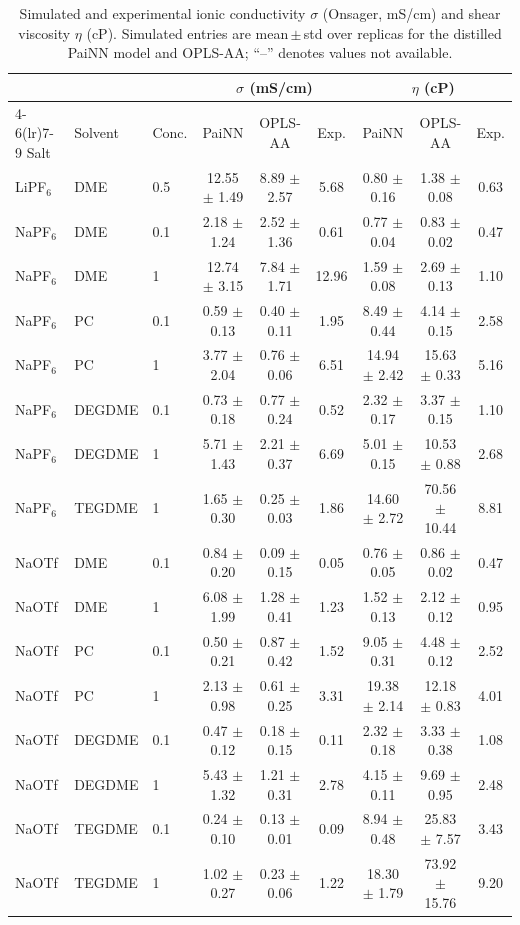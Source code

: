 \begin{table}[h]
\centering
\caption{Simulated and experimental ionic conductivity $\sigma$ (Onsager, mS/cm) and shear viscosity $\eta$ (cP). Simulated entries are mean\,$\pm$\,std over replicas for the distilled PaiNN model and OPLS-AA; ``--'' denotes values not available.}
\label{tab:transport-cond-visc}
\small
\setlength{\tabcolsep}{5pt}
\begin{tabular}{lll ccc ccc}
\toprule
 & & & \multicolumn{3}{c}{$\sigma$ (mS/cm)}
     & \multicolumn{3}{c}{$\eta$ (cP)} \\
\cmidrule(lr){4-6}\cmidrule(lr){7-9}
Salt & Solvent & Conc. & PaiNN & OPLS-AA & Exp. & PaiNN & OPLS-AA & Exp. \\
\midrule
LiPF$_6$ & DME & 0.5 & 12.55 $\pm$ 1.49 & 8.89 $\pm$ 2.57 & 5.68 & 0.80 $\pm$ 0.16 & 1.38 $\pm$ 0.08 & 0.63 \\
NaPF$_6$ & DME & 0.1 & 2.18 $\pm$ 1.24 & 2.52 $\pm$ 1.36 & 0.61 & 0.77 $\pm$ 0.04 & 0.83 $\pm$ 0.02 & 0.47 \\
NaPF$_6$ & DME & 1 & 12.74 $\pm$ 3.15 & 7.84 $\pm$ 1.71 & 12.96 & 1.59 $\pm$ 0.08 & 2.69 $\pm$ 0.13 & 1.10 \\
NaPF$_6$ & PC & 0.1 & 0.59 $\pm$ 0.13 & 0.40 $\pm$ 0.11 & 1.95 & 8.49 $\pm$ 0.44 & 4.14 $\pm$ 0.15 & 2.58 \\
NaPF$_6$ & PC & 1 & 3.77 $\pm$ 2.04 & 0.76 $\pm$ 0.06 & 6.51 & 14.94 $\pm$ 2.42 & 15.63 $\pm$ 0.33 & 5.16 \\
NaPF$_6$ & DEGDME & 0.1 & 0.73 $\pm$ 0.18 & 0.77 $\pm$ 0.24 & 0.52 & 2.32 $\pm$ 0.17 & 3.37 $\pm$ 0.15 & 1.10 \\
NaPF$_6$ & DEGDME & 1 & 5.71 $\pm$ 1.43 & 2.21 $\pm$ 0.37 & 6.69 & 5.01 $\pm$ 0.15 & 10.53 $\pm$ 0.88 & 2.68 \\
NaPF$_6$ & TEGDME & 1 & 1.65 $\pm$ 0.30 & 0.25 $\pm$ 0.03 & 1.86 & 14.60 $\pm$ 2.72 & 70.56 $\pm$ 10.44 & 8.81 \\
NaOTf & DME & 0.1 & 0.84 $\pm$ 0.20 & 0.09 $\pm$ 0.15 & 0.05 & 0.76 $\pm$ 0.05 & 0.86 $\pm$ 0.02 & 0.47 \\
NaOTf & DME & 1 & 6.08 $\pm$ 1.99 & 1.28 $\pm$ 0.41 & 1.23 & 1.52 $\pm$ 0.13 & 2.12 $\pm$ 0.12 & 0.95 \\
NaOTf & PC & 0.1 & 0.50 $\pm$ 0.21 & 0.87 $\pm$ 0.42 & 1.52 & 9.05 $\pm$ 0.31 & 4.48 $\pm$ 0.12 & 2.52 \\
NaOTf & PC & 1 & 2.13 $\pm$ 0.98 & 0.61 $\pm$ 0.25 & 3.31 & 19.38 $\pm$ 2.14 & 12.18 $\pm$ 0.83 & 4.01 \\
NaOTf & DEGDME & 0.1 & 0.47 $\pm$ 0.12 & 0.18 $\pm$ 0.15 & 0.11 & 2.32 $\pm$ 0.18 & 3.33 $\pm$ 0.38 & 1.08 \\
NaOTf & DEGDME & 1 & 5.43 $\pm$ 1.32 & 1.21 $\pm$ 0.31 & 2.78 & 4.15 $\pm$ 0.11 & 9.69 $\pm$ 0.95 & 2.48 \\
NaOTf & TEGDME & 0.1 & 0.24 $\pm$ 0.10 & 0.13 $\pm$ 0.01 & 0.09 & 8.94 $\pm$ 0.48 & 25.83 $\pm$ 7.57 & 3.43 \\
NaOTf & TEGDME & 1 & 1.02 $\pm$ 0.27 & 0.23 $\pm$ 0.06 & 1.22 & 18.30 $\pm$ 1.79 & 73.92 $\pm$ 15.76 & 9.20 \\
\bottomrule
\end{tabular}
\end{table}
